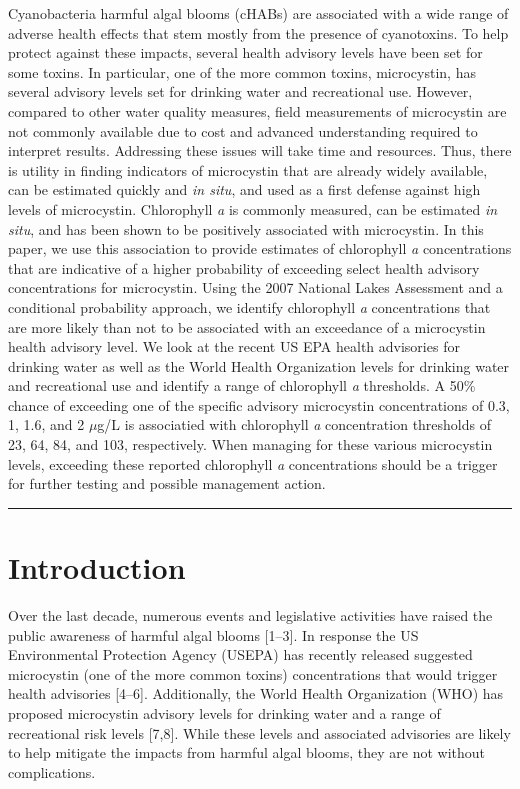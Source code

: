 \documentclass[11pt,]{article}
\begin{document}
Cyanobacteria harmful algal blooms (cHABs) are associated with a wide
range of adverse health effects that stem mostly from the presence of
cyanotoxins. To help protect against these impacts, several health
advisory levels have been set for some toxins. In particular, one of the
more common toxins, microcystin, has several advisory levels set for
drinking water and recreational use. However, compared to other water
quality measures, field measurements of microcystin are not commonly
available due to cost and advanced understanding required to interpret
results. Addressing these issues will take time and resources. Thus,
there is utility in finding indicators of microcystin that are already
widely available, can be estimated quickly and \emph{in situ}, and used
as a first defense against high levels of microcystin. Chlorophyll
\emph{a} is commonly measured, can be estimated \emph{in situ}, and has
been shown to be positively associated with microcystin. In this paper,
we use this association to provide estimates of chlorophyll \emph{a}
concentrations that are indicative of a higher probability of exceeding
select health advisory concentrations for microcystin. Using the 2007
National Lakes Assessment and a conditional probability approach, we
identify chlorophyll \emph{a} concentrations that are more likely than
not to be associated with an exceedance of a microcystin health advisory
level. We look at the recent US EPA health advisories for drinking water
as well as the World Health Organization levels for drinking water and
recreational use and identify a range of chlorophyll \emph{a}
thresholds. A 50\% chance of exceeding one of the specific advisory
microcystin concentrations of 0.3, 1, 1.6, and 2 \(\mu\)g/L is
associatied with chlorophyll \emph{a} concentration thresholds of 23,
64, 84, and 103, respectively. When managing for these various
microcystin levels, exceeding these reported chlorophyll \emph{a}
concentrations should be a trigger for further testing and possible
management action.

\vspace{3mm}

\hrule

\doublespace

\section{Introduction}\label{introduction}

Over the last decade, numerous events and legislative activities have
raised the public awareness of harmful algal blooms {[}1--3{]}. In
response the US Environmental Protection Agency (USEPA) has recently
released suggested microcystin (one of the more common toxins)
concentrations that would trigger health advisories {[}4--6{]}.
Additionally, the World Health Organization (WHO) has proposed
microcystin advisory levels for drinking water and a range of
recreational risk levels {[}7,8{]}. While these levels and associated
advisories are likely to help mitigate the impacts from harmful algal
blooms, they are not without complications.
\end{document}
